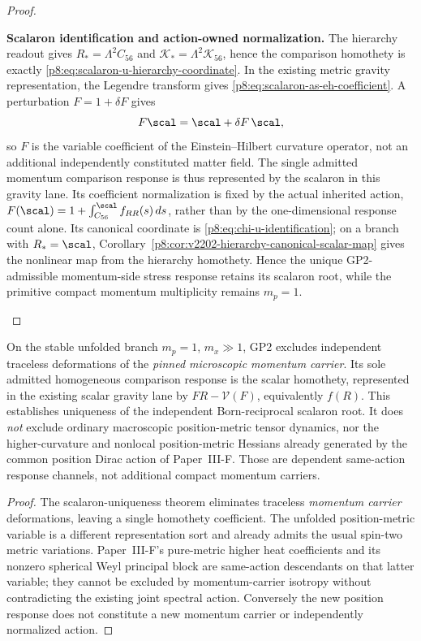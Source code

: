 \documentclass[12pt,a4paper]{article}
\begin{document}
\begin{proof}
\begin{proofsteps}
\item \textbf{Scalaron identification and action-owned normalization.}
The hierarchy readout gives \(R_* = \Lambda^2 C_{56}\) and
\(\mathcal K_* = \Lambda^2\mathcal K_{56}\), hence the comparison
homothety is exactly \eqref{p8:eq:scalaron-u-hierarchy-coordinate}.
In the existing metric gravity representation, the Legendre transform gives
\eqref{p8:eq:scalaron-as-eh-coefficient}.  A perturbation
\(F=1+\delta F\) gives
\[
    F\scal=\scal+\delta F\,\scal,
\]
so \(F\) is the variable coefficient of the Einstein--Hilbert curvature
operator, not an additional independently constituted matter field.
The single admitted momentum comparison response is thus represented by the
scalaron in this gravity lane.  Its coefficient normalization is fixed by
the actual inherited action,
\(F(\scal)=1+\int_{C_{56}}^{\scal}f_{RR}(s)\,ds\), rather than by the
one-dimensional response count alone.  Its canonical coordinate is
\eqref{p8:eq:chi-u-identification}; on a branch with \(R_*=\scal\),
Corollary~\ref{p8:cor:v2202-hierarchy-canonical-scalar-map} gives the
nonlinear map from the hierarchy homothety.  Hence the unique
GP2-admissible momentum-side stress response retains its scalaron root,
while the primitive compact momentum multiplicity remains \(m_p=1\).
\end{proofsteps}
\end{proof}

\begin{corollary}
\label{p8:cor:scalar-only-modified-gravity-lane}
On the stable unfolded branch \(m_p=1\), \(m_x\gg1\), GP2 excludes
independent traceless deformations of the \emph{pinned microscopic momentum
carrier}.  Its sole admitted homogeneous comparison response is the scalar
homothety, represented in the existing scalar gravity lane by
\(FR-\mathcal V(F)\), equivalently \(f(R)\).  This establishes uniqueness
of the independent Born-reciprocal scalaron root.  It does \emph{not}
exclude ordinary macroscopic position-metric tensor dynamics, nor the
higher-curvature and nonlocal position-metric Hessians already generated by
the common position Dirac action of Paper~III-F.  Those are dependent
same-action response channels, not additional compact momentum carriers.
\end{corollary}

\begin{proof}
The scalaron-uniqueness theorem eliminates traceless \emph{momentum carrier}
deformations, leaving a single homothety coefficient.  The unfolded
position-metric variable is a different representation sort and already
admits the usual spin-two metric variations.  Paper~III-F's pure-metric
higher heat coefficients and its nonzero spherical Weyl principal block
are same-action descendants on that latter variable; they cannot be
excluded by momentum-carrier isotropy without contradicting the existing
joint spectral action.  Conversely the new position response does not
constitute a new momentum carrier or independently normalized action.
\end{proof}
\end{document}
